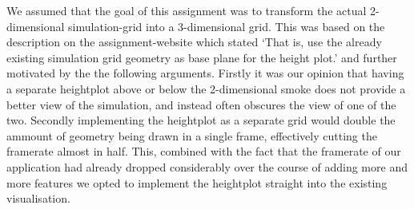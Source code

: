 \documentclass[a4paper,11pt,twoside]{report}
\begin{document}
		We assumed that the goal of this assignment was to transform the actual 2-dimensional simulation-grid into a 3-dimensional grid. This was based on the description on the assignment-website which stated `That is, use the already existing simulation grid geometry as base plane for the height plot.' and further motivated by the the following arguments. Firstly it was our opinion that having a separate heightplot above or below the 2-dimensional smoke does not provide a better view of the simulation, and instead often obscures the view of one of the two. Secondly implementing the heightplot as a separate grid would double the ammount of geometry being drawn in a single frame, effectively cutting the framerate almost in half. This, combined with the fact that the framerate of our application had already dropped considerably over the course of adding more and more features we opted to implement the heightplot straight into the existing visualisation.
\end{document}

